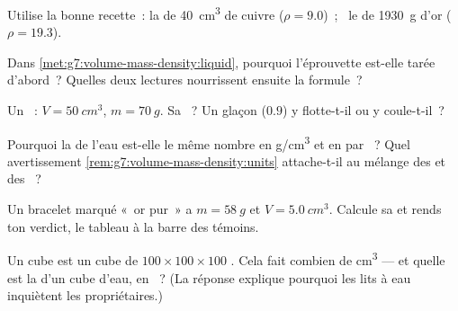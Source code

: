 \begin{exercise}[$\star$]\label{exo:g7:volume-mass-density:3}
Utilise la bonne recette~: la  de \qty{40}{cm^3} de cuivre
($\rho = 9.0$)~; \ le  de \qty{1930}{g} d'or ($\rho = 19.3$).
\end{exercise}

\begin{exercise}[$\star$]\label{exo:g7:volume-mass-density:4}
Dans \cref{met:g7:volume-mass-density:liquid}, pourquoi l'éprouvette
est-elle tarée d'abord~? Quelles deux lectures nourrissent ensuite la
formule~?
\end{exercise}

\begin{exercise}[$\star$]\label{exo:g7:volume-mass-density:5}
Un ~: $V = \qty{50}{cm^3}$, $m = \qty{70}{g}$. Sa ~? Un glaçon ($0.9$) y flotte-t-il ou y coule-t-il~?
\end{exercise}

\begin{exercise}[$\star$]\label{exo:g7:volume-mass-density:6}
Pourquoi la  de l'eau est-elle le même nombre en
\unit{g/cm^3} et en  par ~? Quel avertissement
\cref{rem:g7:volume-mass-density:units} attache-t-il au mélange des
 et des ~?
\end{exercise}

\begin{exercise}[$\star$]\label{exo:g7:volume-mass-density:7}
Un bracelet marqué «~or pur~» a $m = \qty{58}{g}$ et
$V = \qty{5.0}{cm^3}$. Calcule sa  et rends ton
verdict, le tableau à la barre des témoins.
\end{exercise}

\begin{exercise}[$\star\star$]\label{exo:g7:volume-mass-density:8}
Un  cube est un cube de $100 \times 100 \times 100$
. Cela fait combien de \unit{cm^3} --- et quelle est la
 d'un  cube d'eau, en ~? (La réponse explique
pourquoi les lits à eau inquiètent les propriétaires.)
\end{exercise}


